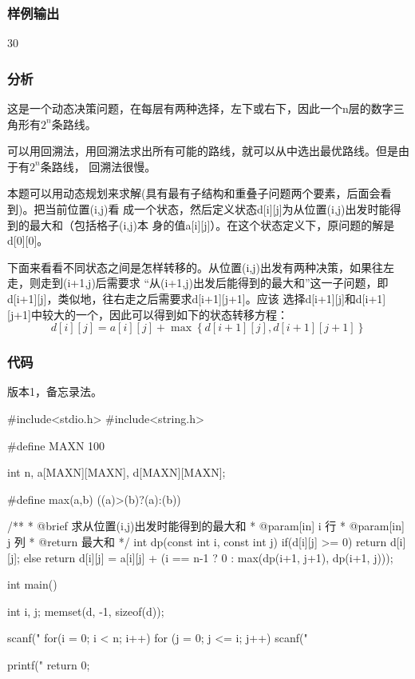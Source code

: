 \subsubsection{样例输出}
\begin{Code}
30
\end{Code}

\subsubsection{分析}
这是一个动态决策问题，在每层有两种选择，左下或右下，因此一个n层的数字三角形有$2^n$条路线。

可以用回溯法，用回溯法求出所有可能的路线，就可以从中选出最优路线。但是由于有$2^n$条路线，
回溯法很慢。

本题可以用动态规划来求解(具有最有子结构和重叠子问题两个要素，后面会看到)。把当前位置(i,j)看
成一个状态，然后定义状态d[i][j]为从位置(i,j)出发时能得到的最大和（包括格子(i,j)本
身的值a[i][j]）。在这个状态定义下，原问题的解是d[0][0]。

下面来看看不同状态之间是怎样转移的。从位置(i,j)出发有两种决策，如果往左走，则走到(i+1,j)后需要求
“从(i+1,j)出发后能得到的最大和”这一子问题，即d[i+1][j]，类似地，往右走之后需要求d[i+1][j+1]。应该
选择d[i+1][j]和d[i+1][j+1]中较大的一个，因此可以得到如下的状态转移方程：
$$d[i][j]=a[i][j]+\max\left\{d[i+1][j], d[i+1][j+1]\right\}$$

\subsubsection{代码}
版本1，备忘录法。

\begin{Codex}[label=numbers_triangle1.c]
#include<stdio.h>
#include<string.h>

#define MAXN 100

int n, a[MAXN][MAXN], d[MAXN][MAXN];

#define max(a,b) ((a)>(b)?(a):(b))

/**
 * @brief 求从位置(i,j)出发时能得到的最大和
 * @param[in] i 行
 * @param[in] j 列
 * @return 最大和
 */
int dp(const int i, const int j) {
    if(d[i][j] >= 0) {
        return d[i][j];
    } else {
        return d[i][j] = a[i][j] + (i == n-1 ? 0 : max(dp(i+1, j+1), dp(i+1, j)));
    }
}

int main() {
    int i, j;
    memset(d, -1, sizeof(d));

    scanf("%
    for(i = 0; i < n; i++)
      for (j = 0; j <= i; j++) scanf("%
    
    printf("%
    return 0;
}
\end{Codex}

